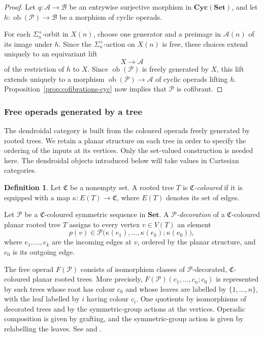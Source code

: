 \documentclass{amsart}
\newcommand{\Set}{\mathbf{Set}}
\newcommand{\Cyc}{\mathbf{Cyc}}
\newcommand{\ob}{\operatorname{ob}}
\theoremstyle{definition}
\newtheorem{definition}[theorem]{Definition}%
\numberwithin{equation}{section}
\begin{document}
\begin{proof}
Let $q\colon\mathcal A\to\mathcal B$ be an entrywise surjective
morphism in $\Cyc(\Set)$, and let
$h\colon\ob(\mathcal P)\to\mathcal B$ be a morphism of cyclic
operads.

For each $\Sigma_n^+$-orbit in $X(n)$, choose one generator and a
preimage in $\mathcal A(n)$ of its image under $h$. Since the
$\Sigma_n^+$-action on $X(n)$ is free, these choices extend uniquely
to an equivariant lift
\[
X\longrightarrow\mathcal A
\]
of the restriction of $h$ to $X$. Since $\ob(\mathcal P)$ is freely
generated by $X$, this lift extends uniquely to a morphism
$\ob(\mathcal P)\to\mathcal A$ of cyclic operads lifting $h$.
Proposition~\ref{prop:cofibrations-cyc} now implies that $\mathcal P$
is cofibrant.
\end{proof}

\subsubsection{Free operads generated by a tree}
\label{subsec: free operad gen by tree}

The dendroidal category is built from the coloured operads freely
generated by rooted trees. We retain a planar structure on each tree
in order to specify the ordering of the inputs at its vertices. Only
the set-valued construction is needed here. The dendroidal objects
introduced below will take values in Cartesian categories.

\begin{definition}
\label{def: decoration of tree}
Let $\mathfrak C$ be a nonempty set. A rooted tree $T$ is
\emph{$\mathfrak C$-coloured} if it is equipped with a map
$\kappa\colon E(T)\to\mathfrak C$, where $E(T)$ denotes its set of
edges.

Let $\mathcal P$ be a $\mathfrak C$-coloured symmetric sequence in
$\Set$. A \emph{$\mathcal P$-decoration} of a
$\mathfrak C$-coloured planar rooted tree $T$ assigns to every vertex
$v\in V(T)$ an element
\[
p(v)\in
\mathcal P\bigl(
\kappa(e_1),\ldots,\kappa(e_k);\kappa(e_0)
\bigr),
\]
where $e_1,\ldots,e_k$ are the incoming edges at $v$, ordered by the
planar structure, and $e_0$ is its outgoing edge.
\end{definition}

The free operad $F(\mathcal P)$ consists of isomorphism classes of
$\mathcal P$-decorated, $\mathfrak C$-coloured planar rooted trees.
More precisely,
$F(\mathcal P)(c_1,\ldots,c_n;c_0)$ is represented by such trees
whose root has colour $c_0$ and whose leaves are labelled by
$\{1,\ldots,n\}$, with the leaf labelled by $i$ having colour $c_i$.
One quotients by isomorphisms of decorated trees and by the
symmetric-group actions at the vertices. Operadic composition is
given by grafting, and the symmetric-group action is given by
relabelling the leaves. See
\cite[Section~3 and Theorem~3.2]{bm_resolutions} and
\cite[Definition~2.3]{cacti}.
\end{document}
